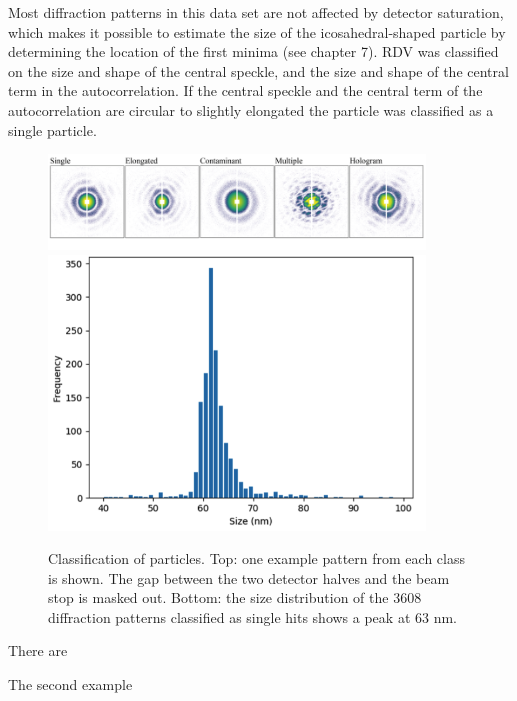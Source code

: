 Most diffraction patterns in this data set are not affected by detector saturation, which makes it possible to estimate the size of the icosahedral-shaped particle by determining the location of the first minima (see chapter 7).
RDV was classified on the size and shape of the central speckle, and the size and shape of the central term in the autocorrelation. If the central speckle and the central term of the autocorrelation are circular to slightly elongated the particle was classified as a single particle.  

\begin{figure}[h]
\centering
\includegraphics[width=100mm]{Chapter_09_Results_RDV_classes.png}
\includegraphics[width=100mm]{Chapter_09_Results_RDV_size_distribution.png}\label{fig:Classes}
\caption{Classification of particles. Top: one example pattern from each class is shown. The gap between the two detector halves and the beam stop is masked out. Bottom: the size distribution of the 3608 diffraction patterns classified as single hits shows a peak at 63 nm.}
\end{figure}

There are

The second example 